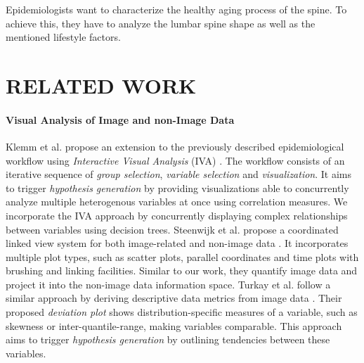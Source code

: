 \documentclass[a4paper,twoside]{style/article}
\begin{document}
Epidemiologists want to characterize the healthy aging process of the spine.
To achieve this, they have to analyze the lumbar spine shape as well as the mentioned lifestyle factors.
\section{\uppercase{Related Work}}
\label{sec:RelatedWork}
\paragraph{Visual Analysis of Image and non-Image Data}
Klemm et al. propose an extension to the previously described epidemiological workflow using \emph{Interactive Visual Analysis} (IVA) \cite{Klemm2014VIS}.
The workflow consists of an iterative sequence of \emph{group selection}, \emph{variable selection} and \emph{visualization}.
It aims to trigger \emph{hypothesis generation} by providing visualizations able to concurrently analyze multiple heterogenous variables at once using correlation measures.
We incorporate the IVA approach by concurrently displaying complex relationships between variables using decision trees.
Steenwijk et al. propose a coordinated linked view system for both image-related and non-image data \cite{Steenwijk}.
It incorporates multiple plot types, such as scatter plots, parallel coordinates and time plots with brushing and linking facilities.
Similar to our work, they quantify image data and project it into the non-image data information space.
Turkay et al. follow a similar approach by deriving descriptive data metrics from image data \cite{Turkay}.
Their proposed \emph{deviation plot} shows distribution-specific measures of a variable, such as skewness or inter-quantile-range, making variables comparable.
This approach aims to trigger \emph{hypothesis generation} by outlining tendencies between these variables.
\end{document}
